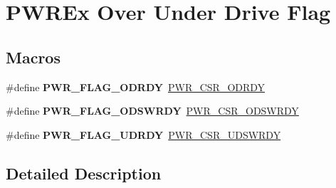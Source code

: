 \hypertarget{group___p_w_r_ex___over___under___drive___flag}{}\section{P\+W\+R\+Ex Over Under Drive Flag}
\label{group___p_w_r_ex___over___under___drive___flag}
\subsection*{Macros}
\begin{DoxyCompactItemize}
\item 
\#define {\bfseries P\+W\+R\+\_\+\+F\+L\+A\+G\+\_\+\+O\+D\+R\+DY}~\hyperlink{group___peripheral___registers___bits___definition_gae35dfabd53bc335d95d330442cdfac6d}{P\+W\+R\+\_\+\+C\+S\+R\+\_\+\+O\+D\+R\+DY}\hypertarget{group___p_w_r_ex___over___under___drive___flag_ga06e6f676b98662bb8a707b43f3505a93}{}\label{group___p_w_r_ex___over___under___drive___flag_ga06e6f676b98662bb8a707b43f3505a93}

\item 
\#define {\bfseries P\+W\+R\+\_\+\+F\+L\+A\+G\+\_\+\+O\+D\+S\+W\+R\+DY}~\hyperlink{group___peripheral___registers___bits___definition_gabb55eb15d71248b59e36a158039f9b54}{P\+W\+R\+\_\+\+C\+S\+R\+\_\+\+O\+D\+S\+W\+R\+DY}\hypertarget{group___p_w_r_ex___over___under___drive___flag_ga69becd2046640bb5616a10b183c6876c}{}\label{group___p_w_r_ex___over___under___drive___flag_ga69becd2046640bb5616a10b183c6876c}

\item 
\#define {\bfseries P\+W\+R\+\_\+\+F\+L\+A\+G\+\_\+\+U\+D\+R\+DY}~\hyperlink{group___peripheral___registers___bits___definition_ga31f0172b9dcefa55d772d4cb0eed6687}{P\+W\+R\+\_\+\+C\+S\+R\+\_\+\+U\+D\+S\+W\+R\+DY}\hypertarget{group___p_w_r_ex___over___under___drive___flag_ga9f3b9b846acf34e8a18af7bcf81d8c79}{}\label{group___p_w_r_ex___over___under___drive___flag_ga9f3b9b846acf34e8a18af7bcf81d8c79}

\end{DoxyCompactItemize}


\subsection{Detailed Description}
